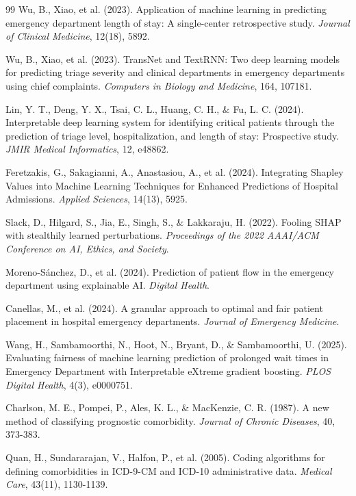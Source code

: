 \documentclass[harvard,article]{frontiersinFPHY_FAMS}
\begin{document}
\begin{thebibliography}{99}
 Wu, B., Xiao, et al. (2023). Application of machine learning in predicting emergency department length of stay: A single-center retrospective study. \textit{Journal of Clinical Medicine}, 12(18), 5892.

 Wu, B., Xiao, et al. (2023). TransNet and TextRNN: Two deep learning models for predicting triage severity and clinical departments in emergency departments using chief complaints. \textit{Computers in Biology and Medicine}, 164, 107181.

 Lin, Y. T., Deng, Y. X., Tsai, C. L., Huang, C. H., \& Fu, L. C. (2024). Interpretable deep learning system for identifying critical patients through the prediction of triage level, hospitalization, and length of stay: Prospective study. \textit{JMIR Medical Informatics}, 12, e48862.

 Feretzakis, G., Sakagianni, A., Anastasiou, A., et al. (2024). Integrating Shapley Values into Machine Learning Techniques for Enhanced Predictions of Hospital Admissions. \textit{Applied Sciences}, 14(13), 5925.

 Slack, D., Hilgard, S., Jia, E., Singh, S., \& Lakkaraju, H. (2022). Fooling SHAP with stealthily learned perturbations. \textit{Proceedings of the 2022 AAAI/ACM Conference on AI, Ethics, and Society}.

 Moreno-Sánchez, D., et al. (2024). Prediction of patient flow in the emergency department using explainable AI. \textit{Digital Health}.

 Canellas, M., et al. (2024). A granular approach to optimal and fair patient placement in hospital emergency departments. \textit{Journal of Emergency Medicine}.

 Wang, H., Sambamoorthi, N., Hoot, N., Bryant, D., \& Sambamoorthi, U. (2025). Evaluating fairness of machine learning prediction of prolonged wait times in Emergency Department with Interpretable eXtreme gradient boosting. \textit{PLOS Digital Health}, 4(3), e0000751.

 Charlson, M. E., Pompei, P., Ales, K. L., \& MacKenzie, C. R. (1987). A new method of classifying prognostic comorbidity. \textit{Journal of Chronic Diseases}, 40, 373-383.

 Quan, H., Sundararajan, V., Halfon, P., et al. (2005). Coding algorithms for defining comorbidities in ICD-9-CM and ICD-10 administrative data. \textit{Medical Care}, 43(11), 1130-1139.


\end{thebibliography}
\end{document}

